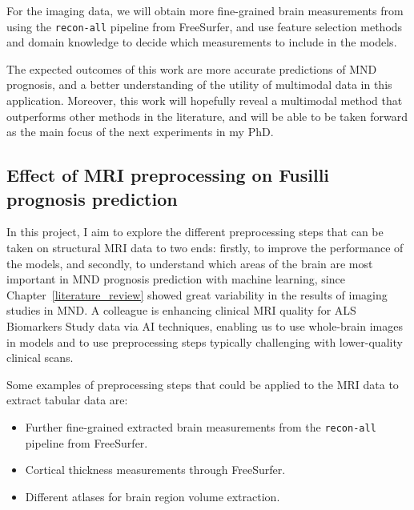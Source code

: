 For the imaging data, we will obtain more fine-grained brain measurements from using the \texttt{recon-all} pipeline from FreeSurfer, and use feature selection methods and domain knowledge to decide which measurements to include in the models.

The expected outcomes of this work are more accurate predictions of MND prognosis, and a better understanding of the utility of multimodal data in this application.
Moreover, this work will hopefully reveal a multimodal method that outperforms other methods in the literature, and will be able to be taken forward as the main focus of the next experiments in my PhD.

\subsection{Effect of MRI preprocessing on Fusilli prognosis prediction}


In this project, I aim to explore the different preprocessing steps that can be taken on structural MRI data to two ends: firstly, to improve the performance of the models, and secondly, to understand which areas of the brain are most important in MND prognosis prediction with machine learning, since Chapter~\ref{literature_review} showed great variability in the results of imaging studies in MND.
A colleague is enhancing clinical MRI quality for ALS Biomarkers Study data via AI techniques, enabling us to use whole-brain images in models and to use preprocessing steps typically challenging with lower-quality clinical scans.

Some examples of preprocessing steps that could be applied to the MRI data to extract tabular data are:
\begin{itemize}
\setlength\itemsep{-0.5em}
    \item Further fine-grained extracted brain measurements from the \texttt{recon-all} pipeline from FreeSurfer.
    \item Cortical thickness measurements through FreeSurfer.
    \item Different atlases for brain region volume extraction.
\end{itemize}

